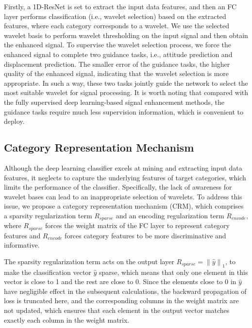 \documentclass[letterpaper]{article} %
\begin{document}
	Firstly, a 1D-ResNet is set to extract the input data features, and then an FC layer performs classification (i.e., wavelet selection) based on the extracted features, where each category corresponds to a wavelet. We use the selected wavelet basis to perform wavelet thresholding on the input signal and then obtain the enhanced signal. To supervise the wavelet selection process, we force the enhanced signal to complete two guidance tasks, i.e., attitude prediction and displacement prediction. The smaller error of the guidance tasks, the higher quality of the enhanced signal, indicating that the wavelet selection is more appropriate. In such a way, these two tasks jointly guide the network to select the most suitable wavelet for signal processing. It is worth noting that compared with the fully supervised deep learning-based signal enhancement methods, the guidance tasks require much less supervision information, which is convenient to deploy.
	
	
	\subsection{Category Representation Mechanism}
	Although the deep learning classifier excels at mining and extracting input data features, it neglects to capture the underlying features of target categories, which limits the performance of the classifier. Specifically, the lack of awareness for wavelet bases can lead to an inappropriate selection of wavelets.
	To address this issue, we propose a category representation mechanism (CRM), which comprises a sparsity regularization term $R_{sparse}$ and an encoding regularization term $R_{encode}$, where $R_{sparse}$ forces the weight matrix of the FC layer to represent category features and $R_{encode}$ forces category features to be more discriminative and informative.
	
	The sparsity regularization term acts on the output layer ${R_{sparse}} = {\left\| {\hat y} \right\|_1}$, to make the classification vector $\hat{y}$ sparse, which means that only one element in this vector is close to 1 and the rest are close to 0. 
	Since the elements close to 0 in $\hat{y}$ have negligible effect in the subsequent calculations, the backward propagation of loss is truncated here, and the corresponding columns in the weight matrix are not updated, which ensures that each element in the output vector matches exactly each column in the weight matrix.
	
\end{document}

